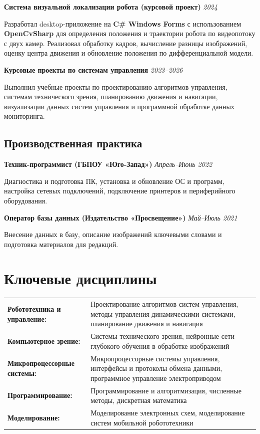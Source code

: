 \documentclass[10pt,a4paper]{article}
\newcommand{\projectEntry}[3]{\textbf{#1} \hfill \textit{#2}\par #3\par\vspace{0.3em}}
\begin{document}
\projectEntry{Система визуальной локализации робота (курсовой проект)}{2024}
{Разработал desktop-приложение на \textbf{C\# Windows Forms} с использованием \textbf{OpenCvSharp} для определения положения и траектории робота по видеопотоку с двух камер. Реализовал обработку кадров, вычисление разницы изображений, оценку центра движения и обновление положения по дифференциальной модели.}

\projectEntry{Курсовые проекты по системам управления}{2023--2026}
{Выполнил учебные проекты по проектированию алгоритмов управления, системам технического зрения, планированию движения и навигации, визуализации данных систем управления и программной обработке данных мониторинга.}

\subsection{Производственная практика}

\projectEntry{Техник-программист (ГБПОУ «Юго-Запад»)}{Апрель--Июнь 2022}
{Диагностика и подготовка ПК, установка и обновление ОС и программ, настройка сетевых подключений, подключение принтеров и периферийного оборудования.}

\projectEntry{Оператор базы данных (Издательство «Просвещение»)}{Май--Июль 2021}
{Внесение данных в базу, описание изображений ключевыми словами и подготовка материалов для редакций.}

\makeEducation

\section{Ключевые дисциплины}

\begin{tabular}{p{6cm} p{10cm}}
    \textbf{Робототехника и управление:} & Проектирование алгоритмов систем управления, методы управления динамическими системами, планирование движения и навигация \\
    \textbf{Компьютерное зрение:} & Системы технического зрения, нейронные сети глубокого обучения в обработке изображений \\
    \textbf{Микропроцессорные системы:} & Микропроцессорные системы управления, интерфейсы и протоколы обмена данными, программное управление электроприводом \\
    \textbf{Программирование:} & Программирование и алгоритмизация, численные методы, дискретная математика \\
    \textbf{Моделирование:} & Моделирование электронных схем, моделирование систем мобильной робототехники
\end{tabular}
\end{document}
